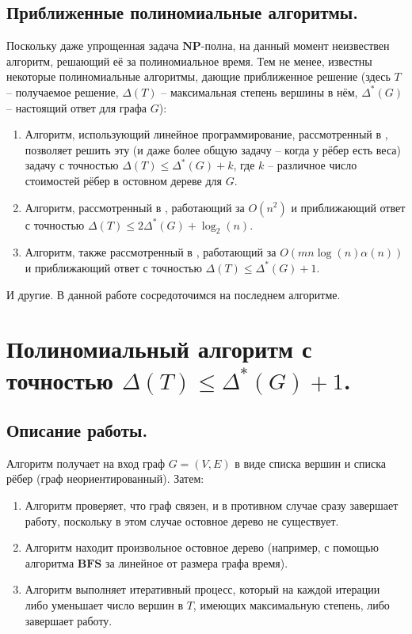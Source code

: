 \documentclass[a4paper,11pt]{article}
\renewcommand{\le}{\ensuremath{\leqslant}}
\theoremstyle{plain}
\theoremstyle{definition}
\theoremstyle{remark}
\begin{document}
\subsection{Приближенные полиномиальные алгоритмы.}

Поскольку даже упрощенная задача $\mathbf{NP}$-полна, на данный момент неизвествен алгоритм, решающий её за полиномиальное время. Тем не менее, известны некоторые полиномиальные алгоритмы, дающие приближенное решение (здесь $T$ -- получаемое решение, $\Delta(T)$ -- максимальная степень вершины в нём, $\Delta^*(G)$ -- настоящий ответ для графа $G$):

\begin{enumerate}
  \item Алгоритм, использующий линейное программирование, рассмотренный в \cite{ref1}, позволяет решить эту (и даже более общую задачу -- когда у рёбер есть веса) задачу с точностью $\Delta(T) \le \Delta^*(G) + k$, где $k$ -- различное число стоимостей рёбер в остовном дереве для $G$.
  \item Алгоритм, рассмотренный в \cite{ref2}, работающий за $O(n^2)$ и приближающий ответ с точностью $\Delta(T) \le 2  \Delta^*(G) + \log_2 (n)$.
  \item Алгоритм, также рассмотренный в \cite{ref2}, работающий за $O(mn\log (n) \alpha(n))$ и приближающий ответ с точностью $\Delta(T) \le \Delta^*(G) + 1$.

\end{enumerate}

И другие. В данной работе сосредоточимся на последнем алгоритме.

\section{Полиномиальный алгоритм с точностью $\Delta(T) \le \Delta^*(G) + 1$.}

\subsection{Описание работы.}

Алгоритм получает на вход граф $G = (V, E)$ в виде списка вершин и списка рёбер (граф неориентированный). Затем:

\begin{enumerate}
  \item Алгоритм проверяет, что граф связен, и в противном случае сразу завершает работу, поскольку в этом случае остовное дерево не существует.
  \item Алгоритм находит произвольное остовное дерево (например, с помощью алгоритма $\mathbf{BFS}$ за линейное от размера графа время).
  \item Алгоритм выполняет итеративный процесс, который на каждой итерации либо уменьшает число вершин в $T$, имеющих максимальную степень, либо завершает работу.
\end{enumerate}
\end{document}
